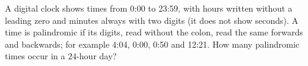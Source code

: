 A digital clock shows times from 0:00 to 23:59, with hours written without a leading zero and minutes always with two digits (it does not show seconds). A time is palindromic if its digits, read without the colon, read the same forwards and backwards; for example 4:04, 0:00, 0:50 and 12:21. How many palindromic times occur in a $24$-hour day?
